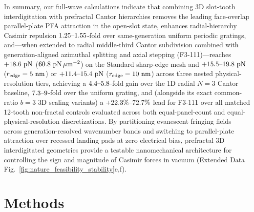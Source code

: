 \documentclass[pdflatex,sn-nature]{sn-jnl}
\DeclareRobustCommand{\roundone}[1]{\fpeval{round(#1,1)}}
\DeclareRobustCommand{\roundtwo}[1]{\fpeval{round(#1,2)}}
\begin{document}
In summary, our full-wave calculations indicate that combining 3D slot-tooth interdigitation with prefractal Cantor hierarchies removes the leading face-overlap parallel-plate PFA attraction in the open-slot state, enhances radial-hierarchy Casimir repulsion $\CantorNtwoFlatzVsUniformBemStdRatio{}\text{--}\roundtwo{\fpeval{\FractalNthreeCantorseventrackBemThetathreeFZPn/\NthreeCurvCylUniformFzPn}}$-fold over same-generation uniform periodic gratings, and---when extended to radial middle-third Cantor subdivision combined with generation-aligned azimuthal splitting and axial stepping (F3-111)---reaches $+\roundone{\NthreeUnithreedFoneoneoneUnifiedFzPn}\text{ pN}$ ($\roundone{\NthreeUnithreedFoneoneoneUnifiedFa}\text{ pN}\,\mu\text{m}^{-2}$) on the Standard sharp-edge mesh and $+\roundone{\NthreeMtFoneoneoneUnifiedRfivenmToneFzPn}\text{--}\roundone{\NthreeMtFoneoneoneUnifiedRfivenmTthreeFzPn}\text{ pN}$ ($r_{\rm edge}=5\text{ nm}$) or $+\roundone{\NthreeMtFoneoneoneUnifiedRonezeronmToneFzPn}\text{--}\roundone{\NthreeMtFoneoneoneUnifiedRonezeronmTthreeFzPn}\text{ pN}$ ($r_{\rm edge}=10\text{ nm}$) across three nested physical-resolution tiers, achieving a $\roundone{\NthreeMtRatioFoneoneoneVsFzerozerozeroRonezeronmTone}\text{--}\roundone{\NthreeUnithreedRatioFoneoneoneVsFzerozerozero}$-fold gain over the 1D radial $N=3$ Cantor baseline, $\roundone{\NthreeMtRatioFoneoneoneVsUnizerozerozeroRonezeronmTone}\text{--}\roundone{\NthreeUnithreedRatioFoneoneoneVsUnizerozerozero}$-fold over the uniform grating, and (alongside its exact common-ratio $b=3$ 3D scaling variants) a $+\roundone{\NthreeUnithreedGainFoneoneoneVsShufonetwoPct}\%\text{--}\roundone{\NthreeMtGainFoneoneoneVsShufonetwoRonezeronmTthreePct}\%$ lead for F3-111 over all matched 12-tooth non-fractal controls evaluated across both equal-panel-count and equal-physical-resolution discretizations. By partitioning evanescent fringing fields across generation-resolved wavenumber bands and switching to parallel-plate attraction over recessed landing pads at zero electrical bias, prefractal 3D interdigitated geometries provide a testable nanomechanical architecture for controlling the sign and magnitude of Casimir forces in vacuum (Extended Data Fig.~\ref{fig:nature_feasibility_stability}e,f).

\section*{Methods}
\label{sec:methods}
\end{document}
